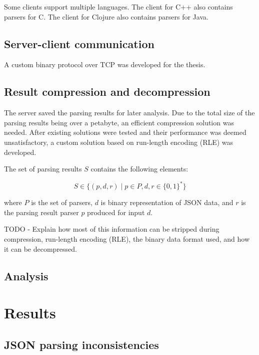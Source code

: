 \documentclass[english, 12pt, a4paper, sci, utf8, a-2b, online]{aaltothesis}
\def\note#1{\begin{flushleft}
	{\color{orange} \raggedright \textsf{#1}}
 \linebreak \noindent
\end{flushleft}}
\begin{document}
Some clients support multiple languages. The client for C++ also contains parsers for C. The client for Clojure also contains parsers for Java.


\subsection{Server-client communication}
A custom binary protocol over TCP was developed for the thesis.


\subsection{Result compression and decompression}
The server saved the parsing results for later analysis. Due to the total size of the parsing results being over a petabyte, an efficient compression solution was needed. After existing solutions were tested and their performance was deemed unsatisfactory, a custom solution based on run-length encoding (RLE) was developed.

The set of parsing results $S$ contains the following elements:

\begin{equation}
	S \in \{(p, d, r) \mid p \in P, d,r \in \{0,1\}^*\}
\end{equation}

where $P$ is the set of parsers, $d$ is binary representation of JSON data, and $r$ is the parsing result parser $p$ produced for input $d$.

\note{TODO - Explain how most of this information can be stripped during compression, run-length encoding (RLE), the binary data format used, and how it can be decompressed.}


\subsection{Analysis}

%


\clearpage

\section{Results}
\subsection{JSON parsing inconsistencies}
\end{document}
